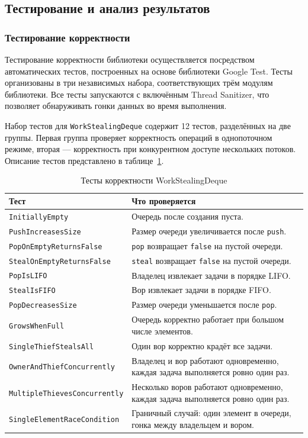 \subsection{Тестирование и анализ результатов}

\subsubsection{Тестирование корректности}

Тестирование корректности библиотеки осуществляется посредством
автоматических тестов, построенных на основе библиотеки Google
Test. Тесты организованы в три независимых набора, соответствующих
трём модулям библиотеки. Все тесты запускаются с включённым
Thread Sanitizer, что позволяет обнаруживать гонки данных
во время выполнения.

Набор тестов для \texttt{WorkStealingDeque} содержит 12 тестов,
разделённых на две группы. Первая группа проверяет корректность
операций в однопоточном режиме, вторая --- корректность при
конкурентном доступе нескольких потоков. Описание тестов
представлено в таблице~\ref{tab:tests-deque}.

\begin{table}[h]
\caption{Тесты корректности WorkStealingDeque}
\label{tab:tests-deque}
\begin{tabularx}{\textwidth}{|l|X|}
\hline
Тест & Что проверяется \\
\hline
\texttt{InitiallyEmpty} &
Очередь после создания пуста. \\
\hline
\texttt{PushIncreasesSize} &
Размер очереди увеличивается после \texttt{push}. \\
\hline
\texttt{PopOnEmptyReturnsFalse} &
\texttt{pop} возвращает \texttt{false} на пустой очереди. \\
\hline
\texttt{StealOnEmptyReturnsFalse} &
\texttt{steal} возвращает \texttt{false} на пустой очереди. \\
\hline
\texttt{PopIsLIFO} &
Владелец извлекает задачи в порядке LIFO. \\
\hline
\texttt{StealIsFIFO} &
Вор извлекает задачи в порядке FIFO. \\
\hline
\texttt{PopDecreasesSize} &
Размер очереди уменьшается после \texttt{pop}. \\
\hline
\texttt{GrowsWhenFull} &
Очередь корректно работает при большом числе элементов. \\
\hline
\texttt{SingleThiefStealsAll} &
Один вор корректно крадёт все задачи. \\
\hline
\texttt{OwnerAndThiefConcurrently} &
Владелец и вор работают одновременно,
каждая задача выполняется ровно один раз. \\
\hline
\texttt{MultipleThievesConcurrently} &
Несколько воров работают одновременно,
каждая задача выполняется ровно один раз. \\
\hline
\texttt{SingleElementRaceCondition} &
Граничный случай: один элемент в очереди,
гонка между владельцем и вором. \\
\hline
\end{tabularx}
\end{table}

